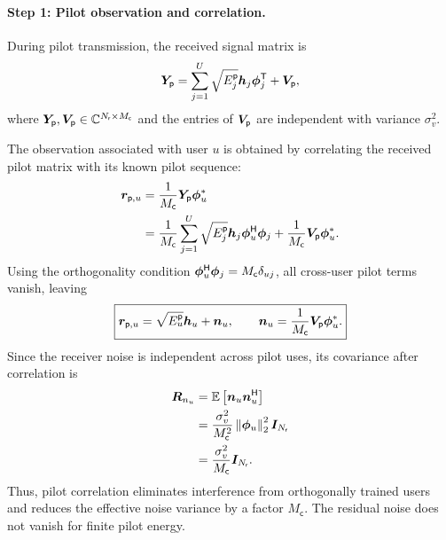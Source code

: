 \paragraph{Step 1: Pilot observation and correlation.}
During pilot transmission, the received signal matrix is
\begin{equation}
	\bm{Y}_{\mathsf p}
	=\sum_{j=1}^{U}\sqrt{E_j^{\mathsf p}}
	\bm{h}_j{\bm{\phi}}^{\mathsf{T}}_j+\bm{V}_{\mathsf p},
	\label{eq06:pilot-model}
\end{equation}
where $\bm{Y}_{\mathsf p},\bm{V}_{\mathsf p}\in\mathbb{C}^{N_{\mathsf{r}}\times M_{\mathsf c}}$ and the entries of $\bm{V}_{\mathsf p}$ are independent with variance $\sigma_v^2$.

The observation associated with user $u$ is obtained by correlating the received pilot matrix with its known pilot sequence:
\begin{equation*}
	\begin{split}
		\bm{r}_{\mathsf p,u}
		&=\frac{1}{M_{\mathsf c}}\bm{Y}_{\mathsf p}{\bm{\phi}}^{*}_u\\
		&=\frac{1}{M_{\mathsf c}}
		\sum_{j=1}^{U}\sqrt{E_j^{\mathsf p}}\bm{h}_j
		{\bm{\phi}}^{\mathsf{H}}_u\bm{\phi}_j
		+\frac{1}{M_{\mathsf c}}\bm{V}_{\mathsf p}{\bm{\phi}}^{*}_u.
	\end{split}
\end{equation*}
Using the orthogonality condition ${\bm{\phi}}^{\mathsf{H}}_u\bm{\phi}_j=M_{\mathsf c}\delta_{uj}$, all cross-user pilot terms vanish, leaving
\begin{equation}
	\boxed{
		\bm{r}_{\mathsf p,u}
		=\sqrt{E_u^{\mathsf p}}\bm{h}_u+\bm{n}_u,
		\qquad
		\bm{n}_u=\frac{1}{M_{\mathsf c}}\bm{V}_{\mathsf p}{\bm{\phi}}^{*}_u.
	}
	\label{eq06:pilot-observation}
\end{equation}
Since the receiver noise is independent across pilot uses, its covariance after correlation is
\begin{equation*}
	\begin{split}
		\bm{R}_{n_u}
		&=\mathbb{E}\left[\bm{n}_u{\bm{n}}^{\mathsf{H}}_u\right]\\
		&=\frac{\sigma_v^2}{M_{\mathsf c}^2}
		\left\|\bm{\phi}_u\right\|_2^2\bm{I}_{N_{\mathsf{r}}}\\
		&=\frac{\sigma_v^2}{M_{\mathsf c}}\bm{I}_{N_{\mathsf{r}}}.
	\end{split}
\end{equation*}
Thus, pilot correlation eliminates interference from orthogonally trained users and reduces the effective noise variance by a factor $M_{\mathsf c}$. The residual noise does not vanish for finite pilot energy.

